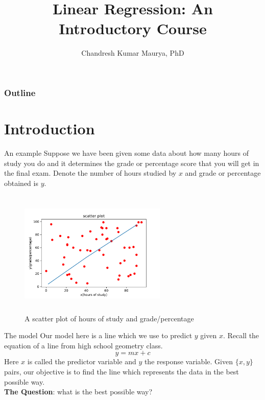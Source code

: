 \documentclass[blue]{beamer}
\title{Linear Regression: An Introductory Course}
\author[Chandresh]{Chandresh Kumar Maurya, PhD\\ }
\institute{Assistant Professor in CSE deptt at IIT Indore  }
\begin{document}
\maketitle



\begin{frame}
\frametitle{Outline}
  \tableofcontents %
\end{frame}
\section{Introduction}

\begin{frame}{An example}
Suppose we have been given some data about how many hours of study you do and it determines the grade or percentage score that
you will get in the final exam. Denote the number of hours studied by ${x}$ and grade or percentage obtained is $y$.

\begin{figure}
\centering
\includegraphics[width=7cm,height=6cm]{lr.pdf}
\caption{A scatter plot of hours of study and grade/percentage}
\label{linear}
\end{figure}
\end{frame}

\begin{frame}{The model}
Our model here is a line which we use to predict $y$ given $x$. Recall the equation of a line from high school geometry class.
\begin{equation}\label{line}
y = mx + c
\end{equation}
Here $x$ is called the \alert{ predictor variable} and $y$ the {\color{blue} response variable}. 
Given $\{x,y\}$ pairs, our objective is to find the line which represents the data in the best possible way.  \\
{\bf The Question}:  what is the best possible way?
\end{frame}
\end{document}
